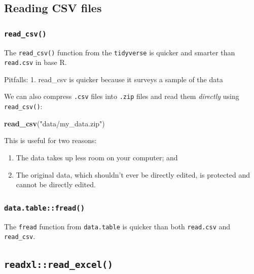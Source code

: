 \documentclass[]{book}
\newenvironment{Shaded}{\begin{snugshade}}{\end{snugshade}}
\newcommand{\KeywordTok}[1]{\textcolor[rgb]{0.13,0.29,0.53}{\textbf{#1}}}
\newcommand{\NormalTok}[1]{#1}
\newcommand{\StringTok}[1]{\textcolor[rgb]{0.31,0.60,0.02}{#1}}
\providecommand{\tightlist}{%
  \setlength{\itemsep}{0pt}\setlength{\parskip}{0pt}}
\begin{document}
\hypertarget{reading-csv-files}{%
\subsection{Reading CSV files}\label{reading-csv-files}}

\hypertarget{read_csv}{%
\subsubsection{\texorpdfstring{\texttt{read\_csv()}}{read\_csv()}}\label{read_csv}}

The \texttt{read\_csv()} function from the \texttt{tidyverse} is quicker and smarter than \texttt{read.csv} in base R.

Pitfalls:
1. read\_csv is quicker because it surveys a sample of the data

We can also compress \texttt{.csv} files into \texttt{.zip} files and read them \emph{directly} using \texttt{read\_csv()}:

\begin{Shaded}
\begin{Highlighting}[]
\KeywordTok{read_csv}\NormalTok{(}\StringTok{"data/my_data.zip"}\NormalTok{)}
\end{Highlighting}
\end{Shaded}

This is useful for two reasons:

\begin{enumerate}
\def\labelenumi{\arabic{enumi}.}
\tightlist
\item
  The data takes up less room on your computer; and
\item
  The original data, which shouldn't ever be directly edited, is protected and cannot be directly edited.
\end{enumerate}

\hypertarget{data.tablefread}{%
\subsubsection{\texorpdfstring{\texttt{data.table::fread()}}{data.table::fread()}}\label{data.tablefread}}

The \texttt{fread} function from \texttt{data.table} is quicker than both \texttt{read.csv} and \texttt{read\_csv}.

\hypertarget{readxlread_excel}{%
\subsection{\texorpdfstring{\texttt{readxl::read\_excel()}}{readxl::read\_excel()}}\label{readxlread_excel}}
\end{document}
